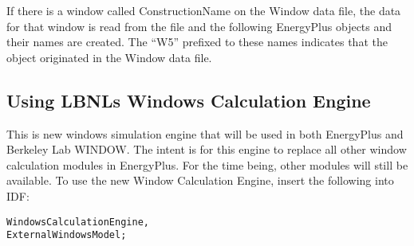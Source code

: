 If there is a window called ConstructionName on the Window data file, the data for that window is read from the file and the following EnergyPlus objects and their names are created. The ``W5'' prefixed to these names indicates that the object originated in the Window data file.

\subsection{Using LBNLs Windows Calculation Engine}\label{windowscalculationengine}
This is new windows simulation engine that will be used in both EnergyPlus and Berkeley Lab WINDOW. The intent is for this engine to replace all other window calculation modules in EnergyPlus. For the time being, other modules will still be available. To use the new Window Calculation Engine, insert the following into IDF:

\begin{lstlisting}
WindowsCalculationEngine,
ExternalWindowsModel;
\end{lstlisting}

